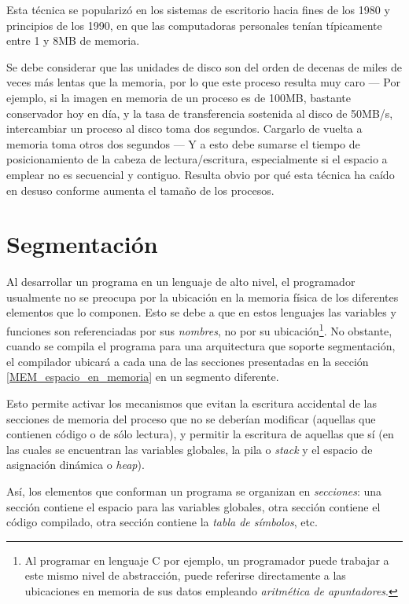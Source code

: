 \documentclass[11pt,fleqn]{book} %
\begin{document}
Esta técnica se popularizó en los sistemas de escritorio hacia fines
de los 1980 y principios de los 1990, en que las computadoras
personales tenían típicamente entre 1 y 8MB de memoria.

Se debe considerar que las unidades de disco son del orden de decenas de miles
de veces más lentas que la memoria, por lo que este proceso resulta
muy caro — Por ejemplo, si la imagen en memoria de un proceso es de
100MB, bastante conservador hoy en día, y la tasa de transferencia
sostenida al disco de 50MB/s, intercambiar un proceso al disco toma
dos segundos. Cargarlo de vuelta a memoria toma otros dos segundos — Y
a esto debe sumarse el tiempo de posicionamiento de la cabeza de
lectura/escritura, especialmente si el espacio a emplear no es
secuencial y contiguo. Resulta obvio por qué esta técnica ha caído en
desuso conforme aumenta el tamaño de los procesos.
\section{Segmentación}
\label{sec-5-3}
\label{MEM_segmentacion}


Al desarrollar un programa en un lenguaje de alto nivel, el programador
usualmente no se preocupa por la ubicación en la memoria física de los
diferentes elementos que lo componen. Esto se debe a que
en estos lenguajes las variables y funciones son referenciadas por sus
\emph{nombres}, no por su ubicación\footnote{Al programar en lenguaje C por ejemplo, un
programador puede trabajar a este mismo nivel de abstracción, puede
referirse directamente a las ubicaciones en memoria de sus datos
empleando \emph{aritmética de apuntadores}. }. No obstante, cuando se compila el
programa para una arquitectura que soporte segmentación, el compilador
ubicará a cada una de las secciones presentadas en la sección
\ref{MEM_espacio_en_memoria} en un segmento diferente.

Esto permite activar los mecanismos que evitan la escritura accidental de las 
secciones de memoria del proceso que no se deberían modificar 
(aquellas que contienen  código o de sólo lectura), y permitir la escritura de aquellas 
que sí (en las cuales se  encuentran las variables globales, 
la pila o \emph{stack} y el espacio de asignación dinámica o \emph{heap}).

Así, los elementos que conforman un programa se organizan en \emph{secciones}:
 una sección contiene el espacio para las  variables globales, 
otra sección contiene el código compilado, otra sección 
contiene la \emph{tabla de símbolos}, etc.
\end{document}
